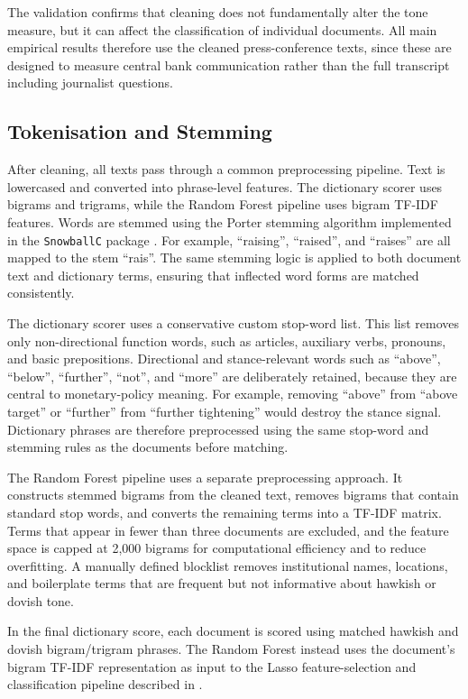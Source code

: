The validation confirms that cleaning does not fundamentally alter the
tone measure, but it can affect the classification of individual
documents. All main empirical results therefore use the cleaned
press-conference texts, since these are designed to measure central bank
communication rather than the full transcript including journalist
questions.

\subsection{Tokenisation and Stemming}
\label{sec:data_tokenisation}

After cleaning, all texts pass through a common preprocessing pipeline.
Text is lowercased and converted into phrase-level features. The
dictionary scorer uses bigrams and trigrams, while the Random Forest
pipeline uses bigram TF-IDF features. Words are stemmed using the Porter
stemming algorithm implemented in the \texttt{SnowballC} package
\citep{porter1980}. For example, ``raising'', ``raised'', and ``raises''
are all mapped to the stem ``rais''. The same stemming logic is applied
to both document text and dictionary terms, ensuring that inflected word
forms are matched consistently.

The dictionary scorer uses a conservative custom stop-word list. This
list removes only non-directional function words, such as articles,
auxiliary verbs, pronouns, and basic prepositions. Directional and
stance-relevant words such as ``above'', ``below'', ``further'', ``not'',
and ``more'' are deliberately retained, because they are central to
monetary-policy meaning. For example, removing ``above'' from
``above target'' or ``further'' from ``further tightening'' would destroy
the stance signal. Dictionary phrases are therefore preprocessed using
the same stop-word and stemming rules as the documents before matching.

The Random Forest pipeline uses a separate preprocessing approach. It
constructs stemmed bigrams from the cleaned text, removes bigrams that
contain standard stop words, and converts the remaining terms into a
TF-IDF matrix. Terms that appear in fewer than three documents are
excluded, and the feature space is capped at 2{,}000 bigrams for
computational efficiency and to reduce overfitting. A manually defined
blocklist removes institutional names, locations, and boilerplate terms
that are frequent but not informative about hawkish or dovish tone.

In the final dictionary score, each document is scored using matched
hawkish and dovish bigram/trigram phrases. The Random Forest instead
uses the document's bigram TF-IDF representation as input to the Lasso
feature-selection and classification pipeline described in
.

